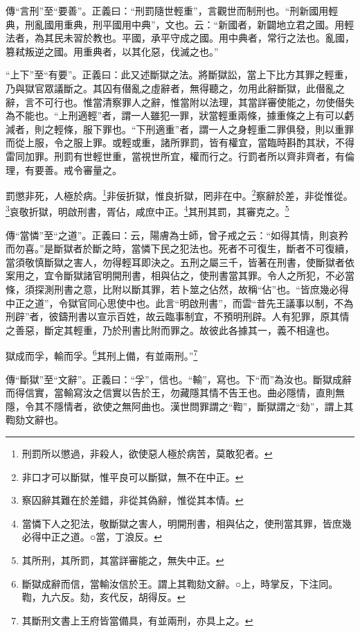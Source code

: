 {\noindent\zhuan{}\fzbyks 傳“言刑”至“要善”。正義曰：“刑罰隨世輕重”，言觀世而制刑也。“刑新國用輕典，刑亂國用重典，刑平國用中典”，文也。云：“新國者，新闢地立君之國。用輕法者，為其民未習於教也。平國，承平守成之國。用中典者，常行之法也。亂國，篡弒叛逆之國。用重典者，以其化惡，伐滅之也。” \par}

{\noindent\shu{}\fzkt “上下”至“有要”。正義曰：此又述斷獄之法。將斷獄訟，當上下比方其罪之輕重，乃與獄官眾議斷之。其囚有僣亂之虛辭者，無得聽之，勿用此辭斷獄，此僣亂之辭，言不可行也。惟當清察罪人之辭，惟當附以法理，其當詳審使能之，勿使僣失為不能也。“上刑適輕”者，謂一人雖犯一罪，狀當輕重兩條，據重條之上有可以虧減者，則之輕條，服下罪也。“下刑適重”者，謂一人之身輕重二罪俱發，則以重罪而從上服，令之服上罪。或輕或重，諸所罪罰，皆有權宜，當臨時斟酌其狀，不得雷同加罪。刑罰有世輕世重，當視世所宜，權而行之。行罰者所以齊非齊者，有倫理，有要善。戒令審量之。 \par}

罰懲非死，人極於病。\footnote{刑罰所以懲過，非殺人，欲使惡人極於病苦，莫敢犯者。}非佞折獄，惟良折獄，罔非在中。\footnote{非口才可以斷獄，惟平良可以斷獄，無不在中正。}察辭於差，非從惟從。\footnote{察囚辭其難在於差錯，非從其偽辭，惟從其本情。}哀敬折獄，明啟刑書，胥佔，咸庶中正。\footnote{當憐下人之犯法，敬斷獄之害人，明開刑書，相與佔之，使刑當其罪，皆庶幾必得中正之道。○當，丁浪反。}其刑其罰，其審克之。\footnote{其所刑，其所罰，其當詳審能之，無失中正。}



{\noindent\zhuan{}\fzbyks 傳“當憐”至“之道”。正義曰：云，陽膚為士師，曾子戒之云：“如得其情，則哀矜而勿喜。”是斷獄者於斷之時，當憐下民之犯法也。死者不可復生，斷者不可復續，當須敬慎斷獄之害人，勿得輕耳即決之。五刑之屬三千，皆著在刑書，使斷獄者依案用之，宜令斷獄諸官明開刑書，相與佔之，使刑書當其罪。令人之所犯，不必當條，須探測刑書之意，比附以斷其罪，若卜筮之佔然，故稱“佔”也。“皆庶幾必得中正之道”，令獄官同心思使中也。此言“明啟刑書”，而雲“昔先王議事以制，不為刑辟”者，彼鑄刑書以宣示百姓，故云臨事制宜，不預明刑辟。人有犯罪，原其情之善惡，斷定其輕重，乃於刑書比附而罪之。故彼此各據其一，義不相違也。 \par}

獄成而孚，輸而孚。\footnote{斷獄成辭而信，當輸汝信於王。謂上其鞫劾文辭。○上，時掌反，下注同。鞫，九六反。劾，亥代反，胡得反。}其刑上備，有並兩刑。”\footnote{其斷刑文書上王府皆當備具，有並兩刑，亦具上之。}

{\noindent\zhuan{}\fzbyks 傳“斷獄”至“文辭”。正義曰：“孚”，信也。“輸”，寫也。下“而”為汝也。斷獄成辭而得信實，當輸寫汝之信實以告於王，勿藏隱其情不告王也。曲必隱情，直則無隱，令其不隱情者，欲使之無阿曲也。漢世問罪謂之“鞫”，斷獄謂之“劾”，謂上其鞫劾文辭也。 \par}

